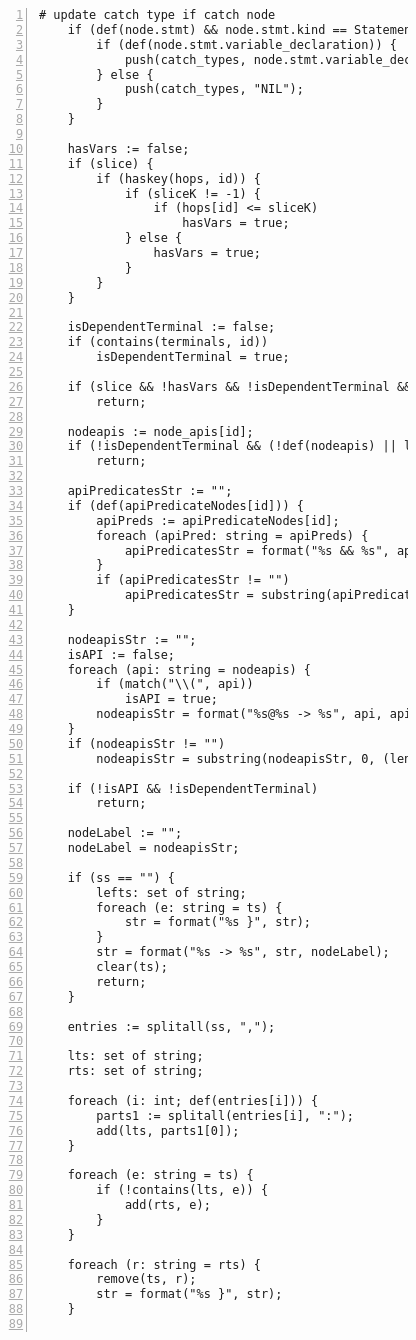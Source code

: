 \begin{figure}[ht!]
\begin{lstlisting}[numbers=left, tabsize=4, escapechar=@, caption={API Usage Mining Analysis},label={lst:aun-code}, lastline = 10]
	# update catch type if catch node
	if (def(node.stmt) && node.stmt.kind == StatementKind.CATCH) {
	    if (def(node.stmt.variable_declaration)) {
	        push(catch_types, node.stmt.variable_declaration.variable_type.name);    
	    } else {
	        push(catch_types, "NIL");
	    }
	}
	
	hasVars := false;
	if (slice) {
		if (haskey(hops, id)) {
			if (sliceK != -1) {
				if (hops[id] <= sliceK)
					hasVars = true;
			} else {
				hasVars = true;
			}	
		}
	}
	    
	isDependentTerminal := false;
	if (contains(terminals, id))
	    isDependentTerminal = true;
	    
	if (slice && !hasVars && !isDependentTerminal && !hasCatchOrFinally(ss))
	    return;
	    
	nodeapis := node_apis[id];
	if (!isDependentTerminal && (!def(nodeapis) || len(nodeapis) == 0))
	    return;
	    
	apiPredicatesStr := "";
	if (def(apiPredicateNodes[id])) { 
	    apiPreds := apiPredicateNodes[id];
	    foreach (apiPred: string = apiPreds) {
	        apiPredicatesStr = format("%s && %s", apiPredicatesStr, apiPred);
	    }
	    if (apiPredicatesStr != "")
	        apiPredicatesStr = substring(apiPredicatesStr, 4);
	}
	
	nodeapisStr := "";    
	isAPI := false;
	foreach (api: string = nodeapis) {
	    if (match("\\(", api))
	        isAPI = true;
	    nodeapisStr = format("%s@%s -> %s", api, apiPredicatesStr, nodeapisStr);    
	}
	if (nodeapisStr != "")
	    nodeapisStr = substring(nodeapisStr, 0, (len(nodeapisStr) - 4));
	    
	if (!isAPI && !isDependentTerminal) 
	    return;
	    
	nodeLabel := ""; 
	nodeLabel = nodeapisStr; 
	
	if (ss == "") {
	    lefts: set of string;
	    foreach (e: string = ts) {
            str = format("%s }", str);
	    }
	    str = format("%s -> %s", str, nodeLabel);
	    clear(ts);
		return;
	}
		
	entries := splitall(ss, ",");
	
	lts: set of string; 
	rts: set of string;
	
	foreach (i: int; def(entries[i])) {
		parts1 := splitall(entries[i], ":");
		add(lts, parts1[0]);
	}	
	
	foreach (e: string = ts) {
		if (!contains(lts, e)) {
			add(rts, e);
		}
	}
	
	foreach (r: string = rts) {
		remove(ts, r);
		str = format("%s }", str);
	}
	

\end{lstlisting}
\end{figure}
